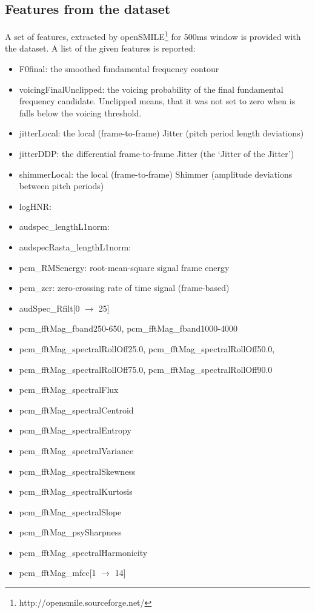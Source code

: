 \subsection{Features from the dataset}

A set of features, extracted by openSMILE\footnote{http://opensmile.sourceforge.net/} for 500ms window is provided with the dataset. 
A list of the given features is reported:


\begin{itemize}
	\item F0ﬁnal: the smoothed fundamental frequency contour
	\item voicingFinalUnclipped: the voicing probability of the ﬁnal fundamental frequency candidate. Unclipped means, that it was not set to zero when is falls below the voicing threshold.

	\item jitterLocal: the local (frame-to-frame) Jitter (pitch period length deviations)

	\item jitterDDP: the diﬀerential frame-to-frame Jitter (the ‘Jitter of the Jitter’)

	\item shimmerLocal: the local (frame-to-frame) Shimmer (amplitude deviations between pitch periods)
	\item logHNR: 
	\item audspec\_lengthL1norm: 
	\item audspecRasta\_lengthL1norm: 
	\item pcm\_RMSenergy: root-mean-square signal frame energy

	\item pcm\_zcr: zero-crossing rate of time signal (frame-based)

	\item audSpec\_Rfilt[0 $\rightarrow$ 25]
	\item pcm\_fftMag\_fband250-650, pcm\_fftMag\_fband1000-4000
	\item pcm\_fftMag\_spectralRollOff25.0, pcm\_fftMag\_spectralRollOff50.0, 
	\item pcm\_fftMag\_spectralRollOff75.0, pcm\_fftMag\_spectralRollOff90.0
	\item pcm\_fftMag\_spectralFlux
	\item pcm\_fftMag\_spectralCentroid
	\item pcm\_fftMag\_spectralEntropy
	\item pcm\_fftMag\_spectralVariance
	\item pcm\_fftMag\_spectralSkewness
	\item pcm\_fftMag\_spectralKurtosis
	\item pcm\_fftMag\_spectralSlope
	\item pcm\_fftMag\_psySharpness
	\item pcm\_fftMag\_spectralHarmonicity
	\item pcm\_fftMag\_mfcc[1 $\rightarrow$ 14]
\end{itemize}


